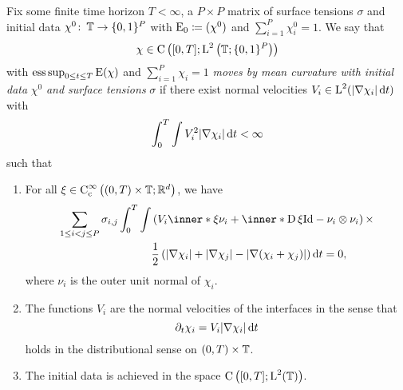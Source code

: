 \begin{definition}
	\label{motion_by_mmcf}
	Fix some finite time horizon $ T < \infty $, a $ P \times P $ matrix of surface tensions $ \sigma $ and initial data $ \chi^{ 0 } \colon \operatorname{\mathbb{T}} \to \{ 0 , 1 \}^{ P } $ with $ \operatorname{E}_{ 0 } \coloneqq ( \chi^{ 0 } ) $ and $ \sum_{ i = 1 }^{ P } \chi_{ i }^{ 0 } = 1 $. We say that
	\begin{equation*}
		\chi \in \operatorname{C} \left(
			[ 0 , T ]
			;
			\operatorname{L}^{ 2 } \left( \operatorname{\mathbb{T}} ; \{ 0 , 1 \}^{ P } \right)
		\right)
	\end{equation*}
	with $ \operatorname*{ess\,sup}_{ 0 \leq t \leq T } \operatorname{E} ( \chi ) $ and $ \sum_{ i = 1 
	}^{ P } \chi_{ i } = 1 $ \emph{moves by mean curvature with initial data} $ 
	\chi^{ 0 } $ \emph{and surface tensions} $ \sigma $ if there exist normal 
	velocities $ V_{ i } \in \operatorname{L}^{ 2 } ( \abs{ \nabla \chi_{ i } } \dd{ t } ) $ 
	with
	\begin{equation*}
		\int_{ 0 }^{ T }
			\int
				V_{ i }^{ 2 }
			\abs{ \nabla \chi_{ i } }
		\dd{ t }
		< \infty 
	\end{equation*} 
	such that
	\begin{enumerate}
		\item For all 
		$ \xi \in \operatorname{C}_{ \mathrm{c} }^{ \infty } \left(
			( 0 , T ) \times \operatorname{\mathbb{T}} ; \mathbb{ R }^{ d }
		\right)
		$, we have 
		\begin{align}
			\label{distributional_equation_mmcf}
			\sum_{ 1 \leq i < j \leq P }
				\sigma_{ i , j }
				\int_{ 0 }^{ T }
					\int
						&
						\left(
							V_{ i } \inner*{ \xi }{ \nu_{ i } }
							+
							\inner*{ \diff \xi }{ \mathrm{Id} - \nu_{ i } \otimes \nu_{ i } }
						\right)
						\times
					\\
				\notag
					& \frac{1}{ 2 }
					\left(
						\abs{ \nabla \chi_{ i } }
						+
						\abs{ \nabla \chi_{ j } }
						-
						\abs{ \nabla ( \chi_{ i } + \chi_{ j } ) }
					\right)
				\dd{ t }
			=0,			
		\end{align}
		where $ \nu_{ i } $ is the outer unit normal of $ \chi_{ i } $.
		
		\item 
		The functions $ V_{ i } $ are the normal velocities of the interfaces in the sense that
		\begin{equation*}
			\partial_{ t } \chi_{ i }
			=
			V_{ i } \abs{ \nabla \chi_{ i } } \dd{ t }
		\end{equation*}
		holds in the distributional sense on $ ( 0 , T ) \times \operatorname{\mathbb{T}} $.
		
		\item
		The initial data is achieved in the space $ \operatorname{C} \left( [ 0 , T ] ; \operatorname{L}^{ 2 } ( \operatorname{\mathbb{T}} ) \right) $.
	\end{enumerate}
\end{definition}

